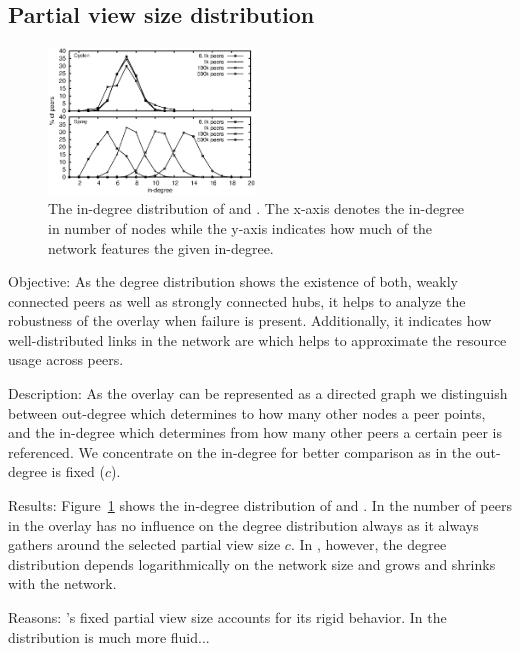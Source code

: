 \subsection{Partial view size distribution}
\label{subsec:dist}

\begin{figure}
  \centering
  \includegraphics[width=0.49\textwidth]{img/histo.eps}
  \caption{\label{fig:histo}The in-degree distribution of \CYCLON{} and \SPRAY{}.
  The x-axis denotes the in-degree in number of nodes while the y-axis indicates 
  how much of the network features the given in-degree.}
\end{figure}

\begin{asparadesc}
\item[Objective:]
    As the degree distribution shows the existence of both,
  weakly connected peers as well as strongly connected hubs, it helps to
  analyze the robustness of the overlay when failure is present.  Additionally,
  it indicates how well-distributed links in the network are which
  helps to approximate the resource usage across peers.
\item[Description:]
    As the overlay can be represented as a directed graph we
  distinguish between out-degree which determines to how many other nodes a
  peer points, and the in-degree which determines from how many other peers a
  certain peer is referenced.  We concentrate on the in-degree for better
  comparison as in \CYCLON{} the out-degree is fixed ($c$).
\item[Results:] Figure~\ref{fig:histo} shows the in-degree distribution of
  \CYCLON{} and \SPRAY{}.  In \CYCLON{} the number of peers in the overlay
  has no influence on the degree distribution always as it always gathers
  around the selected partial view size $c$.  In \SPRAY{}, however, the
  degree distribution depends logarithmically on the network size and grows and
  shrinks with the network.
\item[Reasons:] \CYCLON{}'s fixed partial view size accounts for its rigid
  behavior.  In \SPRAY{} the distribution is much more fluid...
\end{asparadesc}

